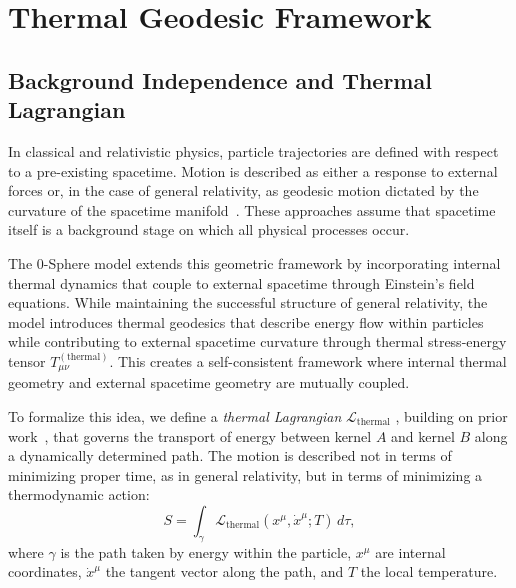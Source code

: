 \documentclass[%
 reprint,
 amsmath,amssymb,
 aps,
]{revtex4-1}
\numberwithin{equation}{section}%
\begin{document}
\section{Thermal Geodesic Framework}
\label{sec:thermal_geodesic_framework}

\subsection{Background Independence and Thermal Lagrangian}
\label{subsec:background_independence}

In classical and relativistic physics, particle trajectories are defined with respect to a pre-existing spacetime. Motion is described as either a response to external forces or, in the case of general relativity, as geodesic motion dictated by the curvature of the spacetime manifold~\cite{landau1975, misner1973}. These approaches assume that spacetime itself is a background stage on which all physical processes occur.

The 0-Sphere model extends this geometric framework by incorporating internal thermal dynamics that couple to external spacetime through Einstein's field equations. While maintaining the successful structure of general relativity, the model introduces thermal geodesics that describe energy flow within particles while contributing to external spacetime curvature through thermal stress-energy tensor $T_{\mu\nu}^{(\text{thermal})}$. This creates a self-consistent framework where internal thermal geometry and external spacetime geometry are mutually coupled. 

To formalize this idea, we define a \textit{thermal Lagrangian} $\mathcal{L}_{\text{thermal}}$ , building on prior work~\cite{hanamura2506.0031}, that governs the transport of energy between kernel $A$ and kernel $B$ along a dynamically determined path. The motion is described not in terms of minimizing proper time, as in general relativity, but in terms of minimizing a thermodynamic action:
\begin{equation} \label{eq:thermal_action}
S = \int_{\gamma} \mathcal{L}_{\text{thermal}}(x^\mu, \dot{x}^\mu; T)\, d\tau,
\end{equation}
where $\gamma$ is the path taken by energy within the particle, $x^\mu$ are internal coordinates, $\dot{x}^\mu$ the tangent vector along the path, and $T$ the local temperature.
\end{document}
